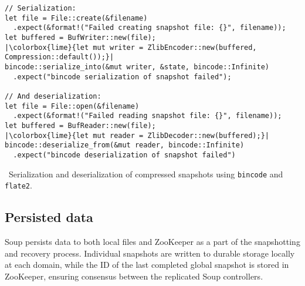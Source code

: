 \begin{listing}[H]
  \begin{verbatim}
// Serialization:
let file = File::create(&filename)
  .expect(&format!("Failed creating snapshot file: {}", filename));
let buffered = BufWriter::new(file);
|\colorbox{lime}{let mut writer = ZlibEncoder::new(buffered, Compression::default());}|
bincode::serialize_into(&mut writer, &state, bincode::Infinite)
  .expect("bincode serialization of snapshot failed");

// And deserialization:
let file = File::open(&filename)
  .expect(&format!("Failed reading snapshot file: {}", filename));
let buffered = BufReader::new(file);
|\colorbox{lime}{let mut reader = ZlibDecoder::new(buffered);}|
bincode::deserialize_from(&mut reader, bincode::Infinite)
  .expect("bincode deserialization of snapshot failed")
  \end{verbatim}
  \caption{\
    Serialization and deserialization of compressed snapshots using
    \texttt{bincode} and \texttt{flate2}.
  }
\end{listing}

\subsection{Persisted data}

Soup persists data to both local files and ZooKeeper as a part of the
snapshotting and recovery process. Individual snapshots are written to durable
storage locally at each domain, while the ID of the last completed global
snapshot is stored in ZooKeeper, ensuring consensus between the replicated Soup
controllers.

